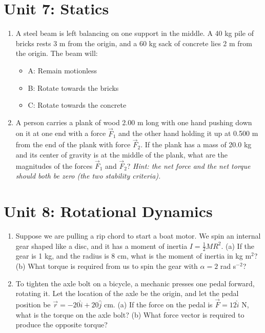 \documentclass[10pt]{article}
\begin{document}
\section{Unit 7: Statics}

\begin{enumerate}
\item A steel beam is left balancing on one support in the middle. A 40 kg pile of bricks rests 3 m from the origin, and a 60 kg sack of concrete lies 2 m from the origin.  The beam will:
\begin{itemize}
\item A: Remain motionless
\item B: Rotate towards the bricks
\item C: Rotate towards the concrete
\end{itemize}
\item A person carries a plank of wood 2.00 m long with one hand pushing down on it at one end with a force $\vec{F}_1$ and the other hand holding it up at 0.500 m from the end of the plank with force $\vec{F}_2$.  If the plank has a mass of 20.0 kg and its center of gravity is at the middle of the plank, what are the magnitudes of the forces $\vec{F}_1$ and $\vec{F}_2$? \textit{Hint: the net force and the net torque should both be zero (the two stability criteria).}\\ \vspace{3cm}
\end{enumerate}

\section{Unit 8: Rotational Dynamics}

\begin{enumerate}
\item Suppose we are pulling a rip chord to start a boat motor. We spin an internal gear shaped like a disc, and it has a moment of inertia $I = \frac{1}{2} M R^2$. (a) If the gear is 1 kg, and the radius is 8 cm, what is the moment of inertia in kg m$^2$? (b) What torque is required from us to spin the gear with $\alpha = 2$ rad s$^{-2}$? \\ \vspace{3cm}
\item To tighten the axle bolt on a bicycle, a mechanic presses one pedal forward, rotating it.  Let the location of the axle be the origin, and let the pedal position be $\vec{r} = -20\hat{i}+20\hat{j}$ cm.  (a) If the force on the pedal is $\vec{F} = 12\hat{i}$ N, what is the torque on the axle bolt? (b) What force vector is required to produce the opposite torque?
\end{enumerate}
\end{document}
